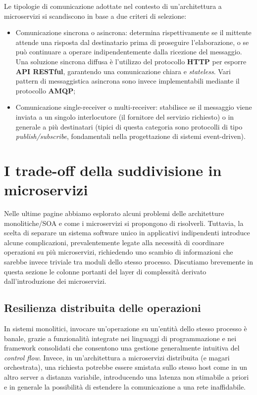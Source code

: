 Le tipologie di comunicazione adottate nel contesto di un'architettura a microservizi si scandiscono in base a due criteri di selezione\cite[19]{Thesis_microservices}:
\begin{itemize}
    \item Comunicazione sincrona o asincrona: determina rispettivamente se il mittente attende una risposta dal destinatario prima di proseguire l'elaborazione, o se può continuare a operare indipendentemente dalla ricezione del messaggio. Una soluzione sincrona diffusa è l'utilizzo del protocollo \textbf{HTTP} per esporre \textbf{API RESTful}, garantendo una comunicazione chiara e \emph{stateless}. Vari pattern di messaggistica asincrona sono invece implementabili mediante il protocollo \textbf{AMQP};
    \item Comunicazione single-receiver o multi-receiver: stabilisce se il messaggio viene inviata a un singolo interlocutore (il fornitore del servizio richiesto) o in generale a più destinatari (tipici di questa categoria sono protocolli di tipo \emph{publish/subscribe}, fondamentali nella progettazione di sistemi event-driven).
\end{itemize}

\section{I trade-off della suddivisione in microservizi}
Nelle ultime pagine abbiamo esplorato alcuni problemi delle architetture monolitiche/SOA e come i microservizi si propongono di risolverli. Tuttavia, la scelta di separare un sistema software unico in applicativi indipendenti introduce alcune complicazioni, prevalentemente legate alla necessità di coordinare operazioni su più microservizi, richiedendo uno scambio di informazioni che sarebbe invece triviale tra moduli dello stesso processo.
Discutiamo brevemente in questa sezione le colonne portanti del layer di complessità derivato dall'introduzione dei microservizi.

\subsection{Resilienza distribuita delle operazioni}
In sistemi monolitici, invocare un'operazione su un'entità dello stesso processo è banale, grazie a funzionalità integrate nei linguaggi di programmazione e nei framework consolidati che consentono una gestione generalmente intuitiva del \emph{control flow}.
Invece, in un'architettura a microservizi distribuita (e magari orchestrata), una richiesta potrebbe essere smistata sullo stesso host come in un altro server a distanza variabile, introducendo una latenza non stimabile a priori e in generale la possibilità di estendere la comunicazione a una rete inaffidabile.

